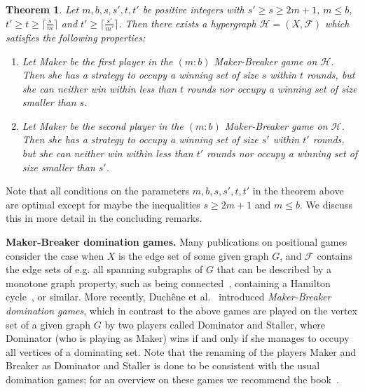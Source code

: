 \documentclass[reqno, 12pt]{amsart}
\numberwithin{equation}{section}
\numberwithin{figure}{section}
\newtheorem{theorem}{Theorem}
\begin{document}
\begin{theorem}\label{thm:construction.MB.time.size}
Let $m,b,s,s',t,t'$ be positive integers
with $s'\geq s\geq 2m+1$, $m\leq b$, $t' \geq t\geq \lceil \frac{s}{m} \rceil$ and $t'\geq \lceil \frac{s'}{m'} \rceil$. Then there exists a hypergraph $\mathcal{H}=(X,\mathcal{F})$ which satisfies the following properties:
\begin{enumerate}
    \item[(1)] Let Maker be the first player in the $(m:b)$ Maker-Breaker game on $\mathcal{H}$. Then she has a strategy to occupy a winning set of size $s$ within $t$ rounds, but she can neither win within less than $t$ rounds nor occupy a winning set of size smaller than $s$.
    \item[(2)] Let Maker be the second player in the $(m:b)$ Maker-Breaker game on $\mathcal{H}$. Then she has a strategy to occupy a winning set of size $s'$ within $t'$ rounds, but she can neither win within less than $t'$ rounds nor occupy a winning set of size smaller than $s'$.
\end{enumerate}
\end{theorem}

Note that all conditions on the parameters
$m,b,s,s',t,t'$ in the theorem above are optimal
except for maybe the inequalities $s\geq 2m+1$ and $m\leq b$. We discuss this in more detail in the concluding remarks.

\medskip

\textbf{Maker-Breaker domination games.}
Many publications on positional games consider the case when
$X$ is the edge set of some given graph $G$, and $\mathcal{F}$
contains the edge sets of e.g. all spanning subgraphs of $G$ that  
can be described by a monotone graph property, such
as being connected~\cite{gebauer2009asymptotic,lehman1964solution}, 
containing a Hamilton cycle~\cite{hefetz2009sharp,krivelevich2011critical}, or similar.
More recently, Duch\^ene et al.~\cite{duchene2020maker} introduced
\textit{Maker-Breaker domination games}, which in contrast to the above games are played on the vertex set of a given graph $G$ by two players
called Dominator and Staller, where Dominator (who is playing as Maker) wins if and only if she manages to
occupy all vertices of a dominating set. 
Note that the renaming of the players Maker and Breaker 
as Dominator and Staller is done to be consistent with the usual domination games; 
for an overview on these games we recommend the book~\cite{brevsar2021domination}.
\end{document}
